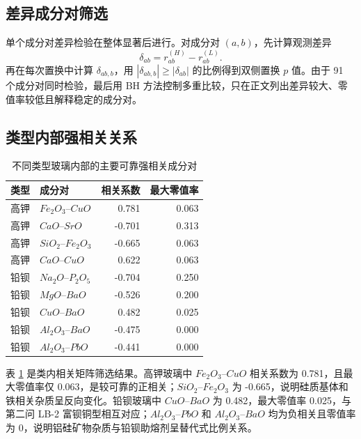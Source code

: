 \documentclass[UTF8,zihao=-4,a4paper,fontset=fandol]{ctexart}
\begin{document}
\subsection{差异成分对筛选}

单个成分对差异检验在整体显著后进行。对成分对 $(a,b)$，先计算观测差异
\begin{equation}
  \delta_{ab}=r_{ab}^{(H)}-r_{ab}^{(L)}.
  \label{eq:corr-diff}
\end{equation}
再在每次置换中计算 $\delta_{ab,b}$，用 $|\delta_{ab,b}|\ge|\delta_{ab}|$ 的比例得到双侧置换 $p$ 值。由于 91 个成分对同时检验，最后用 BH 方法控制多重比较，只在正文列出差异较大、零值率较低且解释稳定的成分对。

\subsection{类型内部强相关关系}

\begin{table}[H]
  \centering
  \caption{不同类型玻璃内部的主要可靠强相关成分对}
  \label{tab:q4-top}
  \begin{tabular}{llrr}
    \toprule
    类型 & 成分对 & 相关系数 & 最大零值率 \\
    \midrule
    高钾 & $Fe_2O_3$--$CuO$ & 0.781 & 0.063 \\
    高钾 & $CaO$--$SrO$ & -0.701 & 0.313 \\
    高钾 & $SiO_2$--$Fe_2O_3$ & -0.665 & 0.063 \\
    高钾 & $CaO$--$CuO$ & 0.622 & 0.063 \\
    铅钡 & $Na_2O$--$P_2O_5$ & -0.704 & 0.250 \\
    铅钡 & $MgO$--$BaO$ & -0.526 & 0.200 \\
    铅钡 & $CuO$--$BaO$ & 0.482 & 0.025 \\
    铅钡 & $Al_2O_3$--$BaO$ & -0.475 & 0.000 \\
    铅钡 & $Al_2O_3$--$PbO$ & -0.441 & 0.000 \\
    \bottomrule
  \end{tabular}
\end{table}

表 \ref{tab:q4-top} 是类内相关矩阵筛选结果。高钾玻璃中 $Fe_2O_3$--$CuO$ 相关系数为 0.781，且最大零值率仅 0.063，是较可靠的正相关；$SiO_2$--$Fe_2O_3$ 为 -0.665，说明硅质基体和铁相关杂质呈反向变化。铅钡玻璃中 $CuO$--$BaO$ 为 0.482，最大零值率 0.025，与第二问 LB-2 富钡铜型相互对应；$Al_2O_3$--$PbO$ 和 $Al_2O_3$--$BaO$ 均为负相关且零值率为 0，说明铝硅矿物杂质与铅钡助熔剂呈替代式比例关系。
\end{document}
